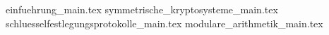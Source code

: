 

{einfuehrung_main.tex}
{symmetrische_kryptosysteme_main.tex}
{schluesselfestlegungsprotokolle_main.tex}
{modulare_arithmetik_main.tex}